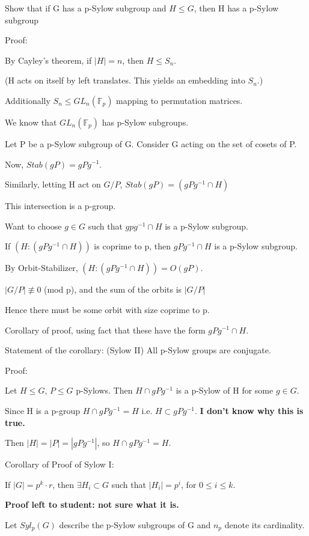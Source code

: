 \documentclass[12pt]{article}
\newcommand{\inv}{^{-1}}
\begin{document}
Show that if G has a p-Sylow subgroup and $H \leq G$, then H has a p-Sylow subgroup

\noindent
Proof:

By Cayley's theorem, if $|H| = n$, then $H \leq S_n$.

(H acts on itself by left translates.  This yields an embedding into $S_n$.)

Additionally $S_n \leq GL_n(\mathds{F}_p)$ mapping to permutation matrices.

We know that $GL_n(\mathds{F}_p)$ has p-Sylow subgroups.

Let P be a p-Sylow subgroup of G.  Consider G acting on the set of cosets of P.

Now, $Stab(gP) = gPg^{-1}$.

Similarly, letting H act on $G \slash P$, $Stab(gP) = (gPg^{-1} \cap H)$

This intersection is a p-group.

Want to choose $g \in G$ such that $gpg^{-1} \cap H$ is a p-Sylow subgroup.

If $(H : (gPg^{-1} \cap H))$ is coprime to p, then $gPg^{-1} \cap H$ is a p-Sylow subgroup.

By Orbit-Stabilizer, $(H : (gPg^{-1} \cap H)) = O(gP)$.

$|G\slash P| \not\equiv 0$ (mod p), and the sum of the orbits is $|G \slash P|$

Hence there must be some orbit with size coprime to p.

\noindent
Corollary of proof, using fact that these have the form $gPg^{-1} \cap H$.

\noindent
Statement of the corollary: (Sylow II) All p-Sylow groups are conjugate.

\noindent
Proof:

Let $H \leq G$, $P \leq G$ p-Sylows.  Then $H \cap gPg^{-1}$ is a p-Sylow of H for some $g \in G$.

Since H is a p-group $H \cap gPg^{-1} = H$ i.e. $H \subset gPg^{-1}$. \textbf{I don't know why this is true.}

Then $|H| = |P| = |gPg^{-1}|$, so $H \cap gPg\inv = H$.

\noindent
Corollary of Proof of Sylow I:

If $|G| = p^k \cdot r$, then $\exists H_i \subset G$ such that $|H_i| = p^i$, for $0 \leq i \leq k$.

\textbf{Proof left to student: not sure what it is.}

\noindent
Let $Syl_p(G)$ describe the p-Sylow subgroups of G and $n_p$ denote its cardinality.
\end{document}

